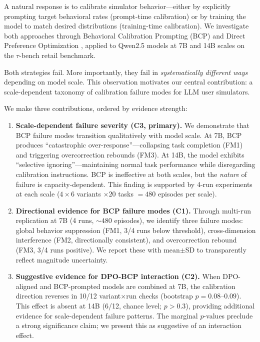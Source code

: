 \documentclass[11pt,a4paper]{article}
\begin{document}
A natural response is to calibrate simulator behavior---either by explicitly prompting target behavioral rates (prompt-time calibration) or by training the model to match desired distributions (training-time calibration). We investigate both approaches through Behavioral Calibration Prompting (BCP) and Direct Preference Optimization \citep[DPO;][]{rafailov2023dpo}, applied to Qwen2.5 models at 7B and 14B scales on the $\tau$-bench retail benchmark.

Both strategies fail. More importantly, they fail in \emph{systematically different ways} depending on model scale. This observation motivates our central contribution: a scale-dependent taxonomy of calibration failure modes for LLM user simulators.

We make three contributions, ordered by evidence strength:

\begin{enumerate}
    \item \textbf{Scale-dependent failure severity (C3, primary).} We demonstrate that BCP failure modes transition qualitatively with model scale. At 7B, BCP produces ``catastrophic over-response''---collapsing task completion (FM1) and triggering overcorrection rebounds (FM3). At 14B, the model exhibits ``selective ignoring''---maintaining normal task performance while disregarding calibration instructions. BCP is ineffective at both scales, but the \emph{nature} of failure is capacity-dependent. This finding is supported by 4-run experiments at each scale ($4 \times 6$ variants $\times 20$ tasks $= 480$ episodes per scale).

    \item \textbf{Directional evidence for BCP failure modes (C1).} Through multi-run replication at 7B (4 runs, ${\sim}480$ episodes), we identify three failure modes: global behavior suppression (FM1, 3/4 runs below threshold), cross-dimension interference (FM2, directionally consistent), and overcorrection rebound (FM3, 3/4 runs positive). We report these with mean$\pm$SD to transparently reflect magnitude uncertainty.

    \item \textbf{Suggestive evidence for DPO-BCP interaction (C2).} When DPO-aligned and BCP-prompted models are combined at 7B, the calibration direction reverses in 10/12 variant$\times$run checks (bootstrap $p = 0.08$--$0.09$). This effect is absent at 14B (6/12, chance level; $p > 0.3$), providing additional evidence for scale-dependent failure patterns. The marginal $p$-values preclude a strong significance claim; we present this as suggestive of an interaction effect.
\end{enumerate}
\end{document}
